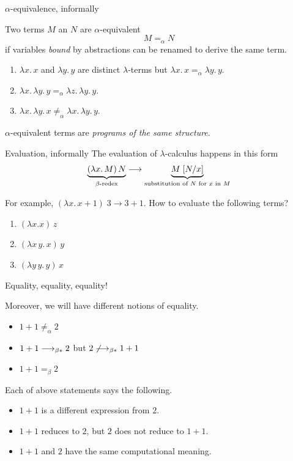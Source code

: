 \begin{frame}{$\alpha$-equivalence, informally}
  \begin{definition}
    Two terms $M$ an $N$ are \alert{$\alpha$-equivalent} 
    \[
      M =_\alpha N
    \]
    if variables \emph{bound} by abstractions can be renamed to derive the same term. 
  \end{definition}
  \begin{example}
    \begin{enumerate}
      \item $\lambda x.\, x$ and $\lambda y.\, y$ are distinct $\lambda$-terms but $\lambda x.\, x
        =_\alpha \lambda y.\, y$. 
      \item $\lambda x.\, \lambda y.\, y =_\alpha 
        \lambda z.\, \lambda y.\, y$. 
      \item $\lambda x.\, \lambda y.\, x \mathrel{\neq}_\alpha
        \lambda x.\, \lambda y.\, y$. 
    \end{enumerate}
  \end{example}
  $\alpha$-equivalent terms are \emph{programs of the same structure}.
  
\end{frame}

\begin{frame}{Evaluation, informally}
  The \alert{evaluation} of $\lambda$-calculus happens in this form 
  \[
    \underbrace{(\lambda x.\, M)\,N}_{\beta\text{-redex}} \longrightarrow 
    \underbrace{M\;[{N}/{x}]}_{\text{substitution of $N$ for $x$ in $M$}}
  \]

  For example, $(\lambda x.\, x +1)\;3 \to 3 + 1$.
  How to evaluate the following terms? 
  \begin{enumerate}
    \item $(\lambda x.x)\,z$
    \item $(\lambda x\, y.\,x)\,y$
    \item $(\lambda y\, y.\,y)\,x$
  \end{enumerate}
\end{frame}

\begin{frame}{Equality, equality, equality!}

  Moreover, we will have different notions of \alert{equality}.

  \begin{itemize}
    \item $1 + 1 \neq_\alpha 2$
    \item $1 + 1 \longrightarrow_{\beta*} 2$ but $2 \not\longrightarrow_{\beta*} 1 + 1$
    \item $1 + 1 =_\beta 2$
  \end{itemize}
  Each of above statements says the following.
  \begin{itemize}
    \item $1 + 1$ is a different expression from $2$.
    \item $1 + 1$ reduces to $2$, but $2$ does not reduce to $1 + 1$.
    \item $1 + 1$ and $2$ have the same computational meaning.
  \end{itemize}
\end{frame}

